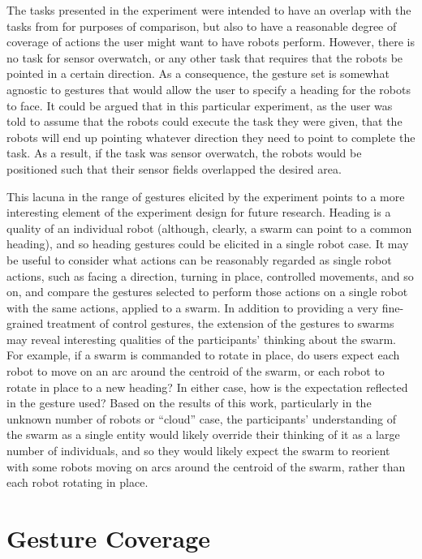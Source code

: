 The tasks presented in the experiment were intended to have an overlap with the tasks from \citep{micire2010multi} for purposes of comparison, but also to have a reasonable degree of coverage of actions the user might want to have robots perform. 
However, there is no task for sensor overwatch, or any other task that requires that the robots be pointed in a certain direction. 
As a consequence, the gesture set is somewhat agnostic to gestures that would allow the user to specify a heading for the robots to face. 
It could be argued that in this particular experiment, as the user was told to assume that the robots could execute the task they were given, that the robots will end up pointing whatever direction they need to point to complete the task. 
As a result, if the task was sensor overwatch, the robots would be positioned such that their sensor fields overlapped the desired area.

This lacuna in the range of gestures elicited by the experiment points to a more interesting element of the experiment design for future research. 
Heading is a quality of an individual robot (although, clearly, a swarm can point to a common heading), and so heading gestures could be elicited in a single robot case. 
It may be useful to consider what actions can be reasonably regarded as single robot actions, such as facing a direction, turning in place, controlled movements, and so on, and compare the gestures selected to perform those actions on a single robot with the same actions, applied to a swarm. 
In addition to providing a very fine-grained treatment of control gestures, the extension of the gestures to swarms may reveal interesting qualities of the participants' thinking about the swarm. 
For example, if a swarm is commanded to rotate in place, do users expect each robot to move on an arc around the centroid of the swarm, or each robot to rotate in place to a new heading?
In either case, how is the expectation reflected in the gesture used?
Based on the results of this work, particularly in the unknown number of robots or ``cloud'' case, the participants' understanding of the swarm as a single entity would likely override their thinking of it as a large number of individuals, and so they would likely expect the swarm to reorient with some robots moving on arcs around the centroid of the swarm, rather than each robot rotating in place. 

\section{Gesture Coverage}

